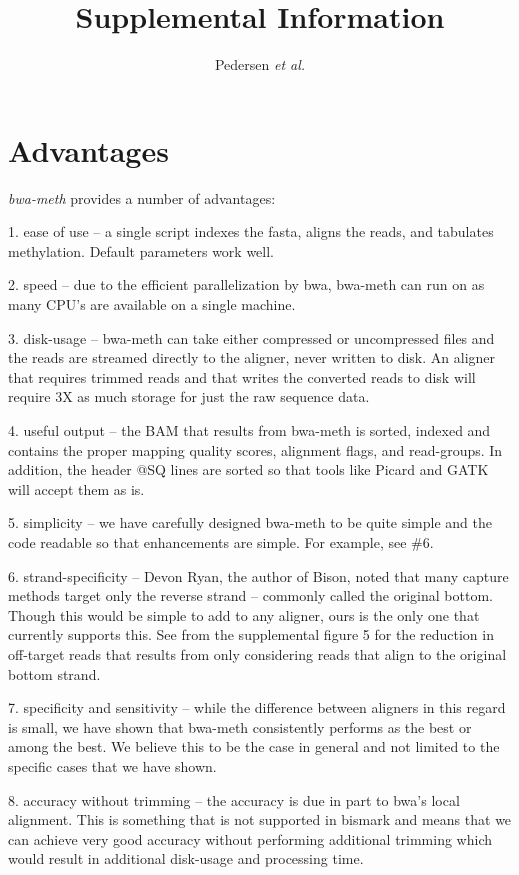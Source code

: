 \documentclass[12pt]{article}
\title{Supplemental Information}
\author{Pedersen \textit{et al.}}
\date{}
\begin{document}
\maketitle

\section{Advantages}
\textit{bwa-meth} provides a number of advantages:

1. ease of use -- a single script indexes the fasta, aligns the reads, and
   tabulates methylation. Default parameters work well.

2. speed -- due to the efficient parallelization by bwa, bwa-meth can run on
   as many CPU's are available on a single machine.

3. disk-usage -- bwa-meth can take either compressed or uncompressed files
   and the reads are streamed directly to the aligner, never written to disk. An
   aligner that requires trimmed reads and that writes the converted reads to
   disk will require 3X as much storage for just the raw sequence data.

4. useful output -- the BAM that results from bwa-meth is sorted, indexed and
   contains the proper mapping quality scores, alignment flags, and read-groups.
   In addition, the header @SQ lines are sorted so that tools like Picard and
   GATK will accept them as is.

5. simplicity -- we have carefully designed bwa-meth to be quite simple and
   the code readable so that enhancements are simple. For example, see \#6.

6. strand-specificity -- Devon Ryan,
   the author of Bison, noted that many capture methods target only the reverse
   strand -- commonly called the original bottom. Though this would be simple to
   add to any aligner, ours is the only one that currently supports this. See
   from the supplemental figure 5 for the reduction in off-target reads that results
   from only considering reads that align to the original bottom strand.

7. specificity and sensitivity -- while the difference between aligners in
   this regard is small, we have shown that bwa-meth consistently performs as
   the best or among the best. We believe this to be the case in general and
   not limited to the specific cases that we have shown.

8. accuracy without trimming -- the accuracy is due in part to bwa's local
   alignment. This is something that is not supported in bismark and means that
   we can achieve very good accuracy without performing additional trimming
   which would result in additional disk-usage and processing time.
\end{document}
